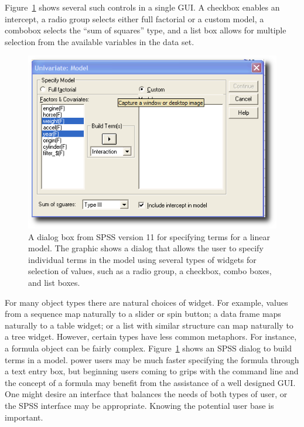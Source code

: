 Figure~\ref{fig:GUI:spss-11-term-selection} shows several such
controls in a single GUI. A checkbox enables an intercept,
a radio group selects either full factorial or a custom
model, a combobox selects the ``sum of squares'' type, and a
list box allows for multiple selection from the available
variables in the data set. 



\begin{figure}
  \centering
  \includegraphics[width=.65\textwidth]{spss-11-model-selection}
 \caption{A dialog box from SPSS version 11 for specifying terms
    for a linear model. The graphic shows a dialog that allows
    the user to specify individual terms in the model  using
    several types of widgets for selection of values, such as a radio
    group, a checkbox, combo boxes, and list boxes. }
  \label{fig:GUI:spss-11-term-selection}
\end{figure}

For many \R\/ object types there are natural choices of widget. For
example, values from a sequence map naturally to a slider or spin
button; a data frame maps naturally to a table widget; or a list with
similar structure can map naturally to a tree widget. However, certain
\R\/ types have less common metaphors. For instance, a formula object
can be fairly complex. Figure~\ref{fig:GUI:spss-11-term-selection}
shows an SPSS dialog to build terms in a model. \R\/ power users may
be much faster specifying the formula through a text entry box, but
beginning \R\/ users coming to grips with the command line and the
concept of a formula may benefit from the assistance of a well
designed GUI. One might desire an interface that balances the needs of
both types of user, or the SPSS interface may be appropriate. Knowing
the potential user base is important.







